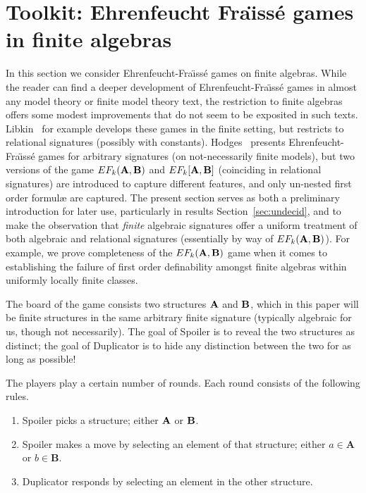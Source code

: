 \documentclass[10pt,a4paper]{amsart}
\theoremstyle{plain}
\theoremstyle{definition}
\newcommand{\A}{\mathbf A}
\newcommand{\B}{\mathbf B}
\begin{document}
\section{Toolkit: Ehrenfeucht Fra\"{\i}ss\'e games in finite algebras}\label{sec:EF}
In this section we consider  Ehrenfeucht-Fra\"{\i}ss\'e games on finite algebras.  
While the reader can find a deeper development of Ehrenfeucht-Fra\"{\i}ss\'e games in almost any model theory or finite model theory text, the restriction to finite algebras offers some modest improvements that do not seem to be exposited in such texts.   
Libkin~\cite{lib} for example develops these games in the finite setting, but restricts to relational signatures (possibly with constants).  
Hodges~\cite{hod} presents Ehrenfeucht-Fra\"{\i}ss\'e games for arbitrary signatures (on not-necessarily finite models), but two versions of the game $EF_k({\bf A},{\bf B})$ and $EF_k[{\bf A},{\bf B}]$ (coinciding in relational signatures) are introduced to capture different features, and only un-nested first order formul{\ae} are captured.  
The present section serves as both a preliminary introduction for later use, particularly in results Section~\ref{sec:undecid}, and to make the observation that \emph{finite} algebraic signatures offer a uniform treatment of both algebraic and relational signatures (essentially by way of $EF_k({\bf A},{\bf B})$).  For example, we prove completeness of the $EF_k({\bf A},{\bf B})$ game when it comes to establishing the failure of first order definability amongst finite algebras within uniformly locally finite classes.  

The board of the game consists two structures ${\bf A}$ and ${\bf B}$, which in this paper will be finite structures in the same arbitrary finite signature (typically algebraic for us, though not necessarily).  The goal of Spoiler is to reveal the two structures as distinct; the goal of Duplicator is to hide any distinction between the two  for as long as possible!

The players play a certain number of rounds.  Each round consists of the following rules.
\begin{enumerate}
\item Spoiler picks a structure; either ${\bf A}$ or ${\bf B}$.
\item Spoiler makes a move by selecting an element of that structure; either $a\in{\A}$ or $b\in{\B}$.
\item Duplicator responds by selecting an element in the other structure.\\
\end{enumerate}
\end{document}
